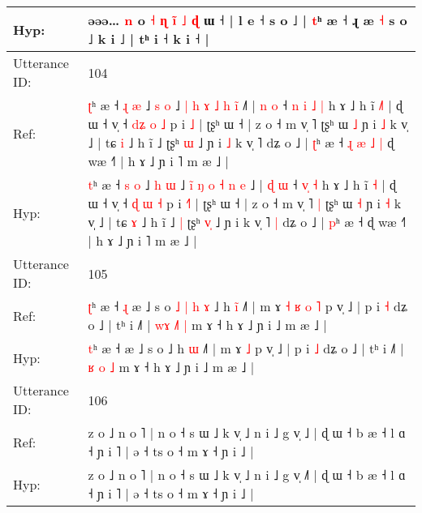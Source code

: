 \documentclass[10pt]{article}
\DeclareRobustCommand{\hl}[1]{{\textcolor{red}{#1}}}
\begin{document}
\begin{longtable}{ll}
 \\
Hyp: & əəə… \hl{n} o \hl{˧} \hl{ɳ} \hl{i}\hl{̃} \hl{˩} \hl{ɖ} ɯ ˧ | l e ˧ s o ˩ |\hl{}\hl{}\hl{}\hl{}\hl{} \hl{t}ʰ æ ˧ ɻ æ \hl{˧} s o\hl{}\hl{}\hl{}\hl{}\hl{}\hl{}\hl{} ˩ k i ˩ | tʰ i ˧ k i ˧ |
 \\
\midrule
Utterance ID: & 104 \\
Ref: & \hl{ʈ}ʰ æ ˧ \hl{ɻ} \hl{æ} ˩ \hl{s} \hl{o} ˩ \hl{}\hl{|} \hl{h} \hl{ɤ} \hl{˩} \hl{h} \hl{i}\hl{̃} ˩\hl{˥} | \hl{n} \hl{o} ˧\hl{ }\hl{n} \hl{i}\hl{ }\hl{˩} \hl{|} h ɤ ˩ h ĩ \hl{˩}\hl{˥} | ɖ ɯ ˧ v̩ ˧ \hl{d}\hl{ʑ} \hl{o} \hl{˩} p i \hl{}\hl{˩} | ʈʂʰ ɯ ˧ | z o ˧ m v̩ ˥\hl{}\hl{} ʈʂʰ ɯ \hl{˩} ɲ i \hl{˩} k v̩ ˩ | tɕ \hl{i} ˩ h ĩ ˩\hl{}\hl{} ʈʂʰ \hl{}\hl{ɯ} ˩ ɲ i\hl{ }\hl{˩} k v̩ ˥\hl{}\hl{} dʑ o ˩ | \hl{ʈ}ʰ æ ˧\hl{ }\hl{ɻ}\hl{ }\hl{æ}\hl{ }\hl{˩}\hl{ }\hl{|} ɖ wæ ˧˥ | h ɤ ˩ ɲ i ˥ m æ ˩ |
 \\
Hyp: & \hl{t}ʰ æ ˧ \hl{s} \hl{o} ˩ \hl{h} \hl{ɯ} ˩ \hl{i}\hl{̃} \hl{ŋ} \hl{o} \hl{˧} \hl{n} \hl{}\hl{e} ˩\hl{} | \hl{ɖ} \hl{ɯ} ˧\hl{}\hl{} \hl{}\hl{v}\hl{̩} \hl{˧} h ɤ ˩ h ĩ \hl{}\hl{˧} | ɖ ɯ ˧ v̩ ˧ \hl{}\hl{ɖ} \hl{ɯ} \hl{˧} p i \hl{˧}\hl{˥} | ʈʂʰ ɯ ˧ | z o ˧ m v̩ ˥\hl{ }\hl{|} ʈʂʰ ɯ \hl{˧} ɲ i \hl{˧} k v̩ ˩ | tɕ \hl{ɤ} ˩ h ĩ ˩\hl{ }\hl{|} ʈʂʰ \hl{v}\hl{̩} ˩ ɲ i\hl{}\hl{} k v̩ ˥\hl{ }\hl{|} dʑ o ˩ | \hl{p}ʰ æ ˧\hl{}\hl{}\hl{}\hl{}\hl{}\hl{}\hl{}\hl{} ɖ wæ ˧˥ | h ɤ ˩ ɲ i ˥ m æ ˩ |
 \\
\midrule
Utterance ID: & 105 \\
Ref: & \hl{ʈ}ʰ æ ˧\hl{ }\hl{ɻ} æ ˩ s o\hl{ }\hl{˩}\hl{ }\hl{|}\hl{ }\hl{h}\hl{ }\hl{ɤ} ˩ h \hl{i}\hl{̃} ˩˥ | m ɤ\hl{ }\hl{˧}\hl{ }\hl{ʁ}\hl{ }\hl{o} \hl{˥} p v̩ ˩ | p i \hl{˧} dʑ o ˩ | tʰ i ˩˥ | \hl{w}\hl{ɤ} \hl{˩}\hl{˥} \hl{|} m ɤ ˧ h ɤ ˩ ɲ i ˩ m æ ˩ |
 \\
Hyp: & \hl{t}ʰ æ ˧\hl{}\hl{} æ ˩ s o\hl{}\hl{}\hl{}\hl{}\hl{}\hl{}\hl{}\hl{} ˩ h \hl{}\hl{ɯ} ˩˥ | m ɤ\hl{}\hl{}\hl{}\hl{}\hl{}\hl{} \hl{˩} p v̩ ˩ | p i \hl{˩} dʑ o ˩ | tʰ i ˩˥ | \hl{}\hl{ʁ} \hl{}\hl{o} \hl{˩} m ɤ ˧ h ɤ ˩ ɲ i ˩ m æ ˩ |
 \\
\midrule
Utterance ID: & 106 \\
Ref: & z o ˩ n o ˥ | n o ˧ s ɯ ˩ k v̩ ˩ n i ˩ g v̩ ˩\hl{} | ɖ ɯ ˧ b æ ˧ l ɑ ˧ ɲ i ˥ | ə ˧ ts o ˧ m ɤ ˧ ɲ i ˩ |
 \\
Hyp: & z o ˩ n o ˥ | n o ˧ s ɯ ˩ k v̩ ˩ n i ˩ g v̩ ˩\hl{˥} | ɖ ɯ ˧ b æ ˧ l ɑ ˧ ɲ i ˥ | ə ˧ ts o ˧ m ɤ ˧ ɲ i ˩ |
 \\
\midrule
\end{longtable}
\end{document}
